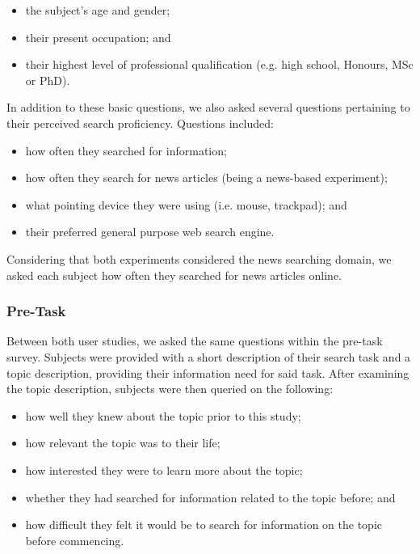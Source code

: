 \begin{itemize}
    \item{the subject's age and gender;}
    \item{their present occupation; and}
    \item{their highest level of professional qualification (e.g. high school, Honours, MSc or PhD).}
\end{itemize}

In addition to these basic questions, we also asked several questions pertaining to their perceived search proficiency. Questions included:

\begin{itemize}
    \item{how often they searched for information;}
    \item{how often they search for news articles (being a news-based experiment);}
    \item{what pointing device they were using (i.e. mouse, trackpad); and}
    \item{their preferred general purpose web search engine.}
\end{itemize}

Considering that both experiments considered the news searching domain, we asked each subject how often they searched for news articles online.

\subsubsection{Pre-Task}
Between both user studies, we asked the same questions within the pre-task survey. Subjects were provided with a short description of their search task and a topic description, providing their information need for said task. After examining the topic description, subjects were then queried on the following:

\begin{itemize}
    \item{how well they knew about the topic prior to this study;}
    \item{how relevant the topic was to their life;}
    \item{how interested they were to learn more about the topic;}
    \item{whether they had searched for information related to the topic before; and}
    \item{how difficult they felt it would be to search for information on the topic before commencing.}
\end{itemize}

